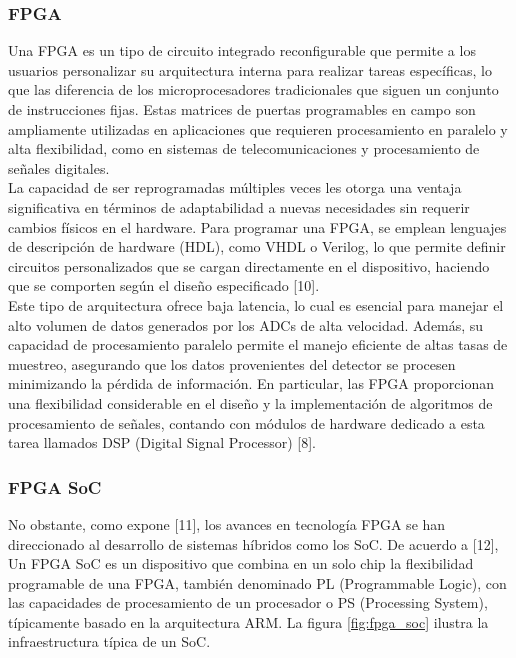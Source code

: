 \documentclass[]{book}
\begin{document}
\subsubsection{FPGA}
\noindent Una FPGA es un tipo de circuito integrado reconfigurable que permite a los usuarios personalizar su arquitectura interna para realizar tareas específicas, lo que las diferencia de los microprocesadores tradicionales que siguen un conjunto de instrucciones fijas. Estas matrices de puertas programables en campo son ampliamente utilizadas en aplicaciones que requieren procesamiento en paralelo y alta flexibilidad, como en sistemas de telecomunicaciones y procesamiento de señales digitales. \\

\noindent La capacidad de ser reprogramadas múltiples veces les otorga una ventaja significativa en términos de adaptabilidad a nuevas necesidades sin requerir cambios físicos en el hardware. Para programar una FPGA, se emplean lenguajes de descripción de hardware (HDL), como VHDL o Verilog, lo que permite definir circuitos personalizados que se cargan directamente en el dispositivo, haciendo que se comporten según el diseño especificado [10].\\

\noindent Este tipo de arquitectura ofrece baja latencia, lo cual es esencial para manejar el alto volumen de datos generados por los ADCs de alta velocidad. Además, su capacidad de procesamiento paralelo permite el manejo eficiente de altas tasas de muestreo, asegurando que los datos provenientes del detector se procesen minimizando la pérdida de información. En particular, las FPGA proporcionan una flexibilidad considerable en el diseño y la implementación de algoritmos de procesamiento de señales, contando con módulos de hardware dedicado a esta tarea llamados DSP (Digital Signal Processor) [8].\\

\subsubsection{FPGA SoC}

\noindent No obstante, como expone [11], los avances en tecnología FPGA se han direccionado al desarrollo de sistemas híbridos como los SoC. De acuerdo a [12], Un FPGA SoC es un dispositivo que combina en un solo chip la flexibilidad programable de una FPGA, también denominado PL (Programmable Logic), con las capacidades de procesamiento de un procesador o PS (Processing System), típicamente basado en la arquitectura ARM. La figura \ref{fig:fpga_soc} ilustra la infraestructura típica de un SoC. \\ 
\end{document}
